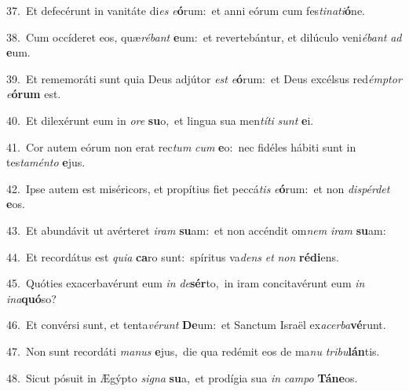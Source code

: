 {\numbfont\textcolor{\numbcolor}{37.}}~Et defecérunt in vanitáte di\textit{es} \textit{e}\-\textbf{ó}rum:~\star et anni eórum cum fes\-\textit{ti}\-\textit{na}\textit{ti}\textbf{ó}ne.\par
{\numbfont\textcolor{\numbcolor}{38.}}~Cum occíderet eos, quæ\-\textit{ré}\-\textit{bant} \textbf{e}\-um:~\star et revertebántur, et dilúculo veni\-\textit{é}\-\textit{bant} \textit{ad} \textbf{e}\-um.\par
{\numbfont\textcolor{\numbcolor}{39.}}~Et rememoráti sunt quia Deus adjútor \textit{est} \textit{e}\-\textbf{ó}rum:~\star et Deus excélsus red\-\textit{émp}\-\textit{tor} \textit{e}\-\textbf{ó}\textbf{rum} est.\par
{\numbfont\textcolor{\numbcolor}{40.}}~Et dilexérunt eum in \textit{o}\-\textit{re} \textbf{su}\-o,~\star et lingua sua men\-\textit{tí}\-\textit{ti} \textit{sunt} \textbf{e}\-i.\par
{\numbfont\textcolor{\numbcolor}{41.}}~Cor autem eórum non erat rec\textit{tum} \textit{cum} \textbf{e}\-o:~\star nec fidéles hábiti sunt in tes\-\textit{ta}\-\textit{mén}\textit{to} \textbf{e}\-jus.\par
{\numbfont\textcolor{\numbcolor}{42.}}~Ipse autem est miséricors, et propítius fiet peccá\textit{tis} \textit{e}\-\textbf{ó}rum:~\star et non \textit{dis}\-\textit{pér}\textit{det} \textbf{e}\-os.\par
{\numbfont\textcolor{\numbcolor}{43.}}~Et abundávit ut avérteret \textit{i}\-\textit{ram} \textbf{su}\-am:~\star et non accéndit om\textit{nem} \textit{i}\-\textit{ram} \textbf{su}\-am:\par
{\numbfont\textcolor{\numbcolor}{44.}}~Et recordátus est \textit{qui}\-\textit{a} \textbf{ca}\-ro sunt:~\star spíritus va\textit{dens} \textit{et} \textit{non} \textbf{réd}\-\textbf{i}ens.\par
{\numbfont\textcolor{\numbcolor}{45.}}~Quóties exacerbavérunt eum \textit{in} \textit{de}\-\textbf{sér}to,~\star in iram concitavérunt eum \textit{in} \textit{in}\-\textit{a}\textbf{quó}so?\par
{\numbfont\textcolor{\numbcolor}{46.}}~Et convérsi sunt, et tenta\-\textit{vé}\-\textit{runt} \textbf{De}\-um:~\star et Sanctum Israël ex\-\textit{a}\-\textit{cer}\textit{ba}\textbf{vé}runt.\par
{\numbfont\textcolor{\numbcolor}{47.}}~Non sunt recordáti \textit{ma}\-\textit{nus} \textbf{e}\-jus,~\star die qua redémit eos de ma\textit{nu} \textit{tri}\-\textit{bu}\textbf{lán}tis.\par
{\numbfont\textcolor{\numbcolor}{48.}}~Sicut pósuit in Ægýpto \textit{si}\-\textit{gna} \textbf{su}\-a,~\star et prodígia sua \textit{in} \textit{cam}\-\textit{po} \textbf{Tá}\-\textbf{ne}os.\par
